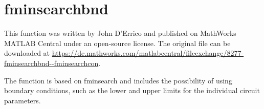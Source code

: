 \documentclass[10pt,a4paper,oneside]{book}
\begin{document}
\section{fminsearchbnd}

This function was written by John D'Errico and published on MathWorks MATLAB Central under an open-source license. The original file can be downloaded at \url{https://de.mathworks.com/matlabcentral/fileexchange/8277-fminsearchbnd--fminsearchcon}.

The function is based on fminsearch and includes the possibility of using boundary conditions, such as the lower and upper limits for the individual circuit parameters.
\end{document}
